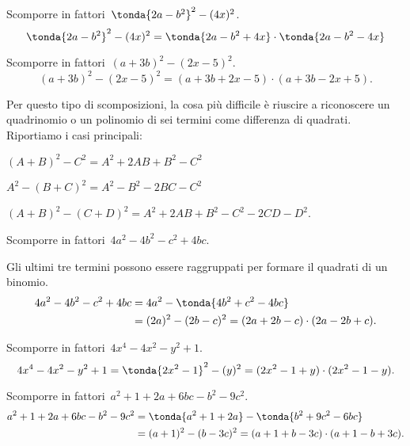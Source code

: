  \begin{esempio}
Scomporre in fattori~\(\tonda{2a-b^{2}}^{2}-(4x)^{2}\).
\[\tonda{2a-b^{2}}^{2}-(4x)^{2}=
\tonda{2a-b^{2}+4x}\cdot \tonda{2a-b^{2}-4x}\]
 \end{esempio}

 \begin{esempio}
Scomporre in fattori~\((a+3b)^{2}-(2x-5)^{2}\).
\[(a+3b)^{2}-(2x-5)^{2}=(a+3b+2x-5)\cdot (a+3b-2x+5).\]
 \end{esempio}

Per questo tipo di scomposizioni, la cosa più difficile è riuscire a 
riconoscere un quadrinomio o un polinomio di sei termini come differenza 
di quadrati. Riportiamo i casi principali:
\begin{itemize*}
 \item \((A+B)^{2}-C^{2}=A^{{2}}+2AB+B^{2}-C^{2}\)
 \item \(A^{2}-(B+C)^{2}=A^{2}-B^{2}-2BC-C^{2}\)
 \item \((A+B)^{2}-(C+D)^{2}=A^{2}+2AB+B^{2}-C^{2}-2CD-D^{2}\).
\end{itemize*}

 \begin{esempio}
Scomporre in fattori~\(4a^{2}-4b^{2}-c^{2}+4bc\).

Gli ultimi tre termini possono essere raggruppati per formare il quadrati di 
un binomio.
 \begin{equation*}
   \begin{split}
     4a^{2}-4b^{2}-c^{2}+4bc &=4a^{2}-\tonda{4b^{2}+c^{2}-4bc} \\
                 &= (2a)^{2}-(2b-c)^{2}=(2a+2b-c)\cdot (2a-2b+c).
   \end{split}
  \end{equation*}
 \end{esempio}

 \begin{esempio}
Scomporre in fattori~\(4x^4-4x^2-y^{2}+1\).
\[4x^4-4x^2-y^{2}+1=\tonda{2x^2-1}^{2}-(y)^{2}=(2x^2-1+y)\cdot 
(2x^2-1-y).\]
 \end{esempio}

 \begin{esempio}
Scomporre in fattori~\(a^{2}+1+2a+6bc-b^{2}-9c^{2}\).
 \begin{equation*}
   \begin{split}
     a^{2}+1+2a+6bc-b^{2}-9c^{2} 
&=\tonda{a^{2}+1+2a}-\tonda{b^{2}+9c^{2}-6{bc}} \\
                 &= (a+1)^{2}-(b-3c)^{2}=(a+1+b-3c)\cdot (a+1-b+3c).
   \end{split}
  \end{equation*}
 \end{esempio}
% 
